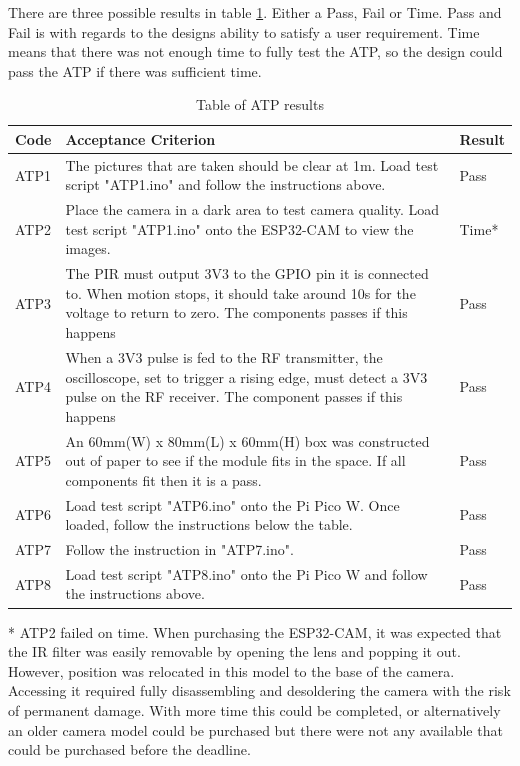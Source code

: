 \documentclass[class=report,11pt,crop=false]{standalone}
\begin{document}
There are three possible results in table \ref{tab:ATPs_result}. Either a Pass, Fail or Time. Pass and Fail is with regards to the designs ability to satisfy a user requirement. Time means that there was not enough time to fully test the ATP, so the design could pass the ATP if there was sufficient time. 

\begin{table}[h]
\centering
\begin{tabular}{|p{1cm}|p{13cm}|p{2cm}|}
\hline
\textbf{Code} & \textbf{Acceptance Criterion} & \textbf{Result} \\
\hline
ATP1 & The pictures that are taken should be clear at 1m. Load test script "ATP1.ino" and follow the instructions above. & Pass \\
\hline
ATP2 & Place the camera in a dark area to test camera quality. Load test script "ATP1.ino" onto the ESP32-CAM to view the images. & Time* \\
\hline
ATP3 & The PIR must output 3V3 to the GPIO pin it is connected to. When motion stops, it should take around 10s for the voltage to return to zero. The components passes if this happens & Pass \\ 
\hline
ATP4 & When a 3V3 pulse is fed to the RF transmitter, the oscilloscope, set to trigger a rising edge, must detect a 3V3 pulse on the RF receiver. The component passes if this happens & Pass \\ 
\hline
ATP5 & An 60mm(W) x 80mm(L) x 60mm(H) box was constructed out of paper to see if the module fits in the space. If all components fit then it is a pass. & Pass \\
\hline
ATP6 & Load test script "ATP6.ino" onto the Pi Pico W. Once loaded, follow the instructions below the table. & Pass \\ 
\hline
ATP7 & Follow the instruction in "ATP7.ino". & Pass \\ 
\hline
ATP8 & Load test script "ATP8.ino" onto the Pi Pico W and follow the instructions above. & Pass \\ 
\hline
\end{tabular}
\caption{Table of ATP results}
\label{tab:ATPs_result}
\end{table}

* ATP2 failed on time. When purchasing the ESP32-CAM, it was expected that the IR filter was easily removable by opening the lens and popping it out. However, position was relocated in this model to the base of the camera. Accessing it required fully disassembling and desoldering the camera with the risk of permanent damage. With more time this could be completed, or alternatively an older camera model could be purchased but there were not any available that could be purchased before the deadline. 
\end{document}
